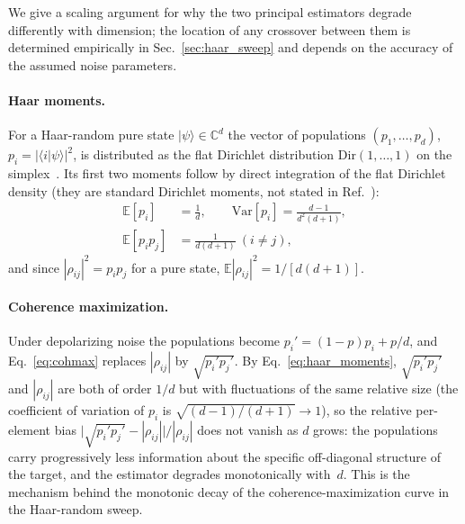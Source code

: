\documentclass[pra,twocolumn,superscriptaddress,longbibliography,floatfix,nofootinbib]{revtex4-2}
\begin{document}
We give a scaling argument for why the two principal estimators degrade differently with dimension; the location of any crossover between them is determined empirically in Sec.~\ref{sec:haar_sweep} and depends on the accuracy of the assumed noise parameters.

\paragraph{Haar moments.}
For a Haar-random pure state $|\psi\rangle \in \mathbb{C}^d$ the vector of populations $(p_1,\dots,p_d)$, $p_i = |\langle i|\psi\rangle|^2$, is distributed as the flat Dirichlet distribution $\mathrm{Dir}(1,\dots,1)$ on the simplex~\cite[Sec.~II.C, Eqs.~(2.8)--(2.9), and App.~A]{ZyczkowskiSommers2001}.
Its first two moments follow by direct integration of the flat Dirichlet density (they are standard Dirichlet moments, not stated in Ref.~\cite{ZyczkowskiSommers2001}):
\begin{equation}
\begin{split}
\mathbb{E}[p_i] &= \frac1d,\qquad
\mathrm{Var}[p_i] = \frac{d-1}{d^2(d+1)},\\
\mathbb{E}[p_i p_j] &= \frac{1}{d(d+1)}\ (i \neq j),
\end{split}
\label{eq:haar_moments}
\end{equation}
and since $|\rho_{ij}|^2 = p_i p_j$ for a pure state, $\mathbb{E}|\rho_{ij}|^2 = 1/[d(d+1)]$.

\paragraph{Coherence maximization.}
Under depolarizing noise the populations become $p_i' = (1-p)p_i + p/d$, and Eq.~\eqref{eq:cohmax} replaces $|\rho_{ij}|$ by $\sqrt{p_i'p_j'}$.
By Eq.~\eqref{eq:haar_moments}, $\sqrt{p_i'p_j'}$ and $|\rho_{ij}|$ are both of order $1/d$ but with fluctuations of the same relative size (the coefficient of variation of $p_i$ is $\sqrt{(d-1)/(d+1)} \to 1$), so the relative per-element bias $\bigl|\sqrt{p_i'p_j'} - |\rho_{ij}|\bigr|/|\rho_{ij}|$ does not vanish as $d$ grows: the populations carry progressively less information about the specific off-diagonal structure of the target, and the estimator degrades monotonically with~$d$.
This is the mechanism behind the monotonic decay of the coherence-maximization curve in the Haar-random sweep.
\end{document}
